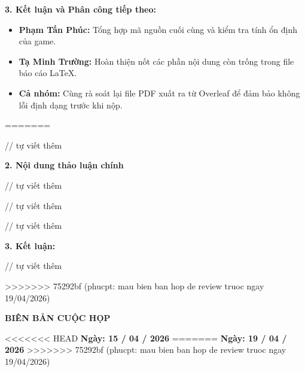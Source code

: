 \documentclass[12pt,a4paper]{article}
\begin{document}
\vspace{2pt}
\textbf{3. Kết luận và Phân công tiếp theo:}
\begin{itemize}
    \item \textbf{Phạm Tấn Phúc:} Tổng hợp mã nguồn cuối cùng và kiểm tra tính ổn định của game.
    \item \textbf{Tạ Minh Trường:} Hoàn thiện nốt các phần nội dung còn trống trong file báo cáo LaTeX.
    \item \textbf{Cả nhóm:} Cùng rà soát lại file PDF xuất ra từ Overleaf để đảm bảo không lỗi định dạng trước khi nộp.
\end{itemize}

=======

// tự viết thêm

\textbf{2. Nội dung thảo luận chính}

// tự viết thêm

// tự viết thêm


// tự viết thêm

\vspace{2pt}
\textbf{3. Kết luận:}

// tự viết thêm

>>>>>>> 75292bf (phucpt: mau bien ban hop de review truoc ngay 19/04/2026)
\newpage

\begin{center}
    {\large\bfseries BIÊN BẢN CUỘC HỌP}
\end{center}
\begin{center}
<<<<<<< HEAD
    \textbf{Ngày: 15 / 04 / 2026}
=======
    \textbf{Ngày: 19 / 04 / 2026}
>>>>>>> 75292bf (phucpt: mau bien ban hop de review truoc ngay 19/04/2026)
\end{center}
\vspace{0.4em}
\end{document}
